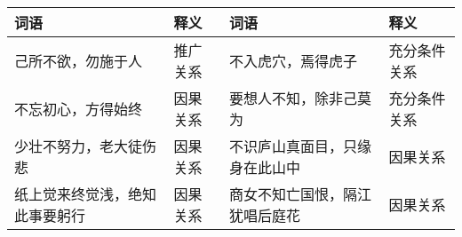 \begin{longtable}{|p{}|p{}|p{}|p{}|}
    \hline
    \textbf{词语}     & \textbf{释义} & \textbf{词语}     & \textbf{释义} \\
    \hline
    己所不欲，勿施于人       & 推广关系        & 不入虎穴，焉得虎子       & 充分条件关系      \\
    \hline
    不忘初心，方得始终       & 因果关系        & 要想人不知，除非己莫为     & 充分条件关系      \\
    \hline
    少壮不努力，老大徒伤悲     & 因果关系        & 不识庐山真面目，只缘身在此山中 & 因果关系        \\
    \hline
    纸上觉来终觉浅，绝知此事要躬行 & 因果关系        & 商女不知亡国恨，隔江犹唱后庭花 & 因果关系        \\
    \hline

\end{longtable}